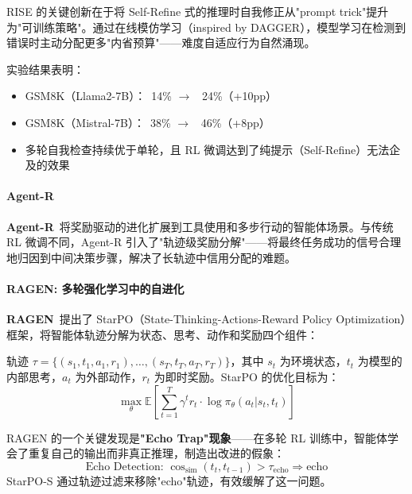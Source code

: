RISE 的关键创新在于将 Self-Refine 式的推理时自我修正从"prompt trick"提升为"可训练策略"。通过在线模仿学习（inspired by DAGGER），模型学习在检测到错误时主动分配更多"内省预算"——难度自适应行为自然涌现。

实验结果表明：
\begin{itemize}
\item GSM8K（Llama2-7B）：~14\% $\rightarrow$ ~24\%（+10pp）
\item GSM8K（Mistral-7B）：~38\% $\rightarrow$ ~46\%（+8pp）
\item 多轮自我检查持续优于单轮，且 RL 微调达到了纯提示（Self-Refine）无法企及的效果
\end{itemize}

\paragraph{Agent-R}

\textbf{Agent-R}~\citep{agentr2024}将奖励驱动的进化扩展到工具使用和多步行动的智能体场景。与传统 RL 微调不同，Agent-R 引入了"轨迹级奖励分解"——将最终任务成功的信号合理地归因到中间决策步骤，解决了长轨迹中信用分配的难题。

\paragraph{RAGEN: 多轮强化学习中的自进化}

\textbf{RAGEN}~\citep{ragen2025}提出了 StarPO（State-Thinking-Actions-Reward Policy Optimization）框架，将智能体轨迹分解为状态、思考、动作和奖励四个组件：

\begin{definition}[StarPO 框架]
轨迹 $\tau = \{(s_1, t_1, a_1, r_1), \ldots, (s_T, t_T, a_T, r_T)\}$，其中 $s_t$ 为环境状态，$t_t$ 为模型的内部思考，$a_t$ 为外部动作，$r_t$ 为即时奖励。StarPO 的优化目标为：
\begin{equation}
\max_\theta \mathbb{E}\left[\sum_{t=1}^{T} \gamma^t r_t \cdot \log \pi_\theta(a_t | s_t, t_t)\right]
\label{eq:starpo}
\end{equation}
\end{definition}

RAGEN 的一个关键发现是\textbf{"Echo Trap"现象}——在多轮 RL 训练中，智能体学会了重复自己的输出而非真正推理，制造出改进的假象：
\begin{equation}
\text{Echo Detection: } \cos_{\mathrm{sim}}(t_t, t_{t-1}) > \tau_{\mathrm{echo}} \Rightarrow \text{echo}
\label{eq:echo-trap}
\end{equation}
StarPO-S 通过轨迹过滤来移除"echo"轨迹，有效缓解了这一问题。

